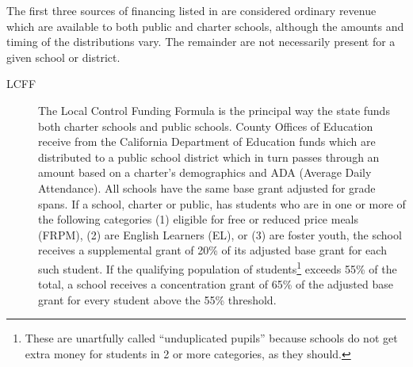The first three sources of financing listed in  are considered ordinary revenue which are available to both public and charter schools, although the amounts and timing of the distributions vary. The remainder are not necessarily present for a given school or district.

\begin{description}
  \item[LCFF] The Local Control Funding Formula is the principal way the state funds both charter schools and public schools. County Offices of Education receive from the California Department of Education funds which are distributed to a public school district which in turn passes through an amount based on a charter's demographics and ADA (Average Daily Attendance). All schools have the same base grant adjusted for grade spans. If a school, charter or public, has students who are in one or more of the following categories (1) eligible for free or reduced price meals (FRPM), (2) are English Learners (EL), or (3) are foster youth, the school receives a supplemental grant of 20\% of its adjusted base grant for each such student. If the qualifying population of students\footnote{These are unartfully called ``unduplicated pupils'' because schools do not get extra money for students in 2 or more categories, as they should.} exceeds 55\% of the total, a school receives a concentration grant of 65\% of the adjusted base grant for every student above the 55\% threshold.


\end{description}
